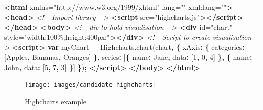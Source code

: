\documentclass[
  10pt,
]{krantz}
\makeatletter
\newenvironment{Shaded}{\begin{snugshade}}{\end{snugshade}}
\newcommand{\AttributeTok}[1]{\textcolor[rgb]{0.61,0.61,0.61}{#1}}
\newcommand{\CommentTok}[1]{\textcolor[rgb]{0.37,0.37,0.37}{\textit{#1}}}
\newcommand{\DataTypeTok}[1]{\textcolor[rgb]{0.27,0.27,0.27}{#1}}
\newcommand{\DecValTok}[1]{\textcolor[rgb]{0.06,0.06,0.06}{#1}}
\newcommand{\KeywordTok}[1]{\textcolor[rgb]{0.27,0.27,0.27}{\textbf{#1}}}
\newcommand{\NormalTok}[1]{#1}
\newcommand{\OperatorTok}[1]{\textcolor[rgb]{0.43,0.43,0.43}{\textbf{#1}}}
\newcommand{\OtherTok}[1]{\textcolor[rgb]{0.37,0.37,0.37}{#1}}
\newcommand{\StringTok}[1]{\textcolor[rgb]{0.5,0.5,0.5}{#1}}
\newcommand{\VariableTok}[1]{\textcolor[rgb]{0,0,0}{#1}}
\newenvironment{kframe}{%
\medskip{}
\setlength{\fboxsep}{.8em}
 \def\at@end@of@kframe{}%
 \ifinner\ifhmode%
  \def\at@end@of@kframe{\end{minipage}}%
  \begin{minipage}{\columnwidth}%
 \fi\fi%
 \def\FrameCommand##1{\hskip\@totalleftmargin \hskip-\fboxsep
 \colorbox{shadecolor}{##1}\hskip-\fboxsep
     \hskip-\linewidth \hskip-\@totalleftmargin \hskip\columnwidth}%
 \MakeFramed {\advance\hsize-\width
   \@totalleftmargin\z@ \linewidth\hsize
   \@setminipage}}%
 {\par\unskip\endMakeFramed%
 \at@end@of@kframe}
\renewenvironment{Shaded}{\begin{kframe}}{\end{kframe}}
\makeatother
\begin{document}
\begin{Shaded}
\begin{Highlighting}[]
\KeywordTok{<html}\OtherTok{ xmlns=}\StringTok{"http://www.w3.org/1999/xhtml"}\OtherTok{ lang=}\StringTok{""}\OtherTok{ xml:lang=}\StringTok{""}\KeywordTok{>}
\KeywordTok{<head>}
  \CommentTok{<!{-}{-} Import library {-}{-}>}
  \KeywordTok{<script}\OtherTok{ src=}\StringTok{"highcharts.js"}\KeywordTok{></script>}
\KeywordTok{</head>}
\KeywordTok{<body>}
  \CommentTok{<!{-}{-} div to hold visualisation {-}{-}>}
  \KeywordTok{<div}\OtherTok{ id=}\StringTok{"chart"}\OtherTok{ style=}\StringTok{"width:100\%;height:400px;"}\KeywordTok{></div>}
  \CommentTok{<!{-}{-} Script to create visualisation {-}{-}>}
  \KeywordTok{<script>}
    \KeywordTok{var}\NormalTok{ myChart }\OperatorTok{=} \VariableTok{Highcharts}\NormalTok{.}\AttributeTok{chart}\NormalTok{(}\StringTok{\textquotesingle{}chart\textquotesingle{}}\OperatorTok{,} \OperatorTok{\{}
        \DataTypeTok{xAxis}\OperatorTok{:} \OperatorTok{\{}
            \DataTypeTok{categories}\OperatorTok{:}\NormalTok{ [}\StringTok{\textquotesingle{}Apples\textquotesingle{}}\OperatorTok{,} \StringTok{\textquotesingle{}Bananas\textquotesingle{}}\OperatorTok{,} \StringTok{\textquotesingle{}Oranges\textquotesingle{}}\NormalTok{]}
        \OperatorTok{\},}
        \DataTypeTok{series}\OperatorTok{:}\NormalTok{ [}\OperatorTok{\{}
            \DataTypeTok{name}\OperatorTok{:} \StringTok{\textquotesingle{}Jane\textquotesingle{}}\OperatorTok{,}
            \DataTypeTok{data}\OperatorTok{:}\NormalTok{ [}\DecValTok{1}\OperatorTok{,} \DecValTok{0}\OperatorTok{,} \DecValTok{4}\NormalTok{]}
        \OperatorTok{\},} \OperatorTok{\{}
            \DataTypeTok{name}\OperatorTok{:} \StringTok{\textquotesingle{}John\textquotesingle{}}\OperatorTok{,}
            \DataTypeTok{data}\OperatorTok{:}\NormalTok{ [}\DecValTok{5}\OperatorTok{,} \DecValTok{7}\OperatorTok{,} \DecValTok{3}\NormalTok{]}
        \OperatorTok{\}}\NormalTok{]}
    \OperatorTok{\}}\NormalTok{)}\OperatorTok{;}
  \KeywordTok{</script>}
\KeywordTok{</body>}
\KeywordTok{</html>}
\end{Highlighting}
\end{Shaded}

\begin{figure}[H]

{\centering \texttt{[image: images/candidate-highcharts]} 

}

\caption{Highcharts example}\label{fig:candidate-highcharts}
\end{figure}
\end{document}
